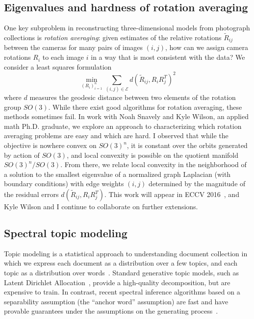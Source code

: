 \documentclass[11pt]{amsart}
\begin{document}
\subsection*{Eigenvalues and hardness of rotation averaging}

One key subproblem in reconstructing three-dimensional models from
photograph collections is {\em rotation averaging}: given estimates of
the relative rotations $\tilde{R}_{ij}$ between the cameras for many
pairs of images $(i,j)$, how can we assign camera rotations $R_i$ to
each image $i$ in a way that is most consistent with the data?  We
consider a least squares formulation
\[
  \min_{(R_i)_{i=1}^n} \sum_{(i,j)
  \in \mathcal{E}} d(\tilde{R}_{ij}, R_i R_j^T)^2
\]
where $d$ measures the geodesic distance between two elements of
the rotation group $SO(3)$.  While there exist good algorithms for
rotation averaging, these methods sometimes fail.  In work with
Noah Snavely and Kyle Wilson, an applied math Ph.D. graduate,
we explore an approach to characterizing which rotation averaging
problems are easy and which are hard.
%
I observed that while the objective is nowhere convex on $SO(3)^n$, it
is constant over the orbits generated by action of $SO(3)$, and local
convexity is possible on the quotient manifold $SO(3)^n/SO(3)$. From
there, we relate local convexity in the neighborhood of a solution to
the smallest eigenvalue of a normalized graph Laplacian (with boundary
conditions) with edge weights $(i,j)$ determined by the magnitude of the
residual errors $d(\tilde{R}_{ij}, R_i R_j^T)$.  This work will appear
in ECCV 2016~\cite{2016-rotations}, and Kyle Wilson and I continue to
collaborate on further extensions.


\subsection*{Spectral topic modeling}

Topic modeling is a statistical approach to understanding
document collection in which we express each document as a distribution
over a few topics, and each topic as a distribution over
words~\cite{Blei:2012:Survey}. Standard
generative topic models, such as
Latent Dirichlet Allocation~\cite{Blei:2003:LDA}, provide a
high-quality decomposition, but are expensive to train. In contrast,
recent spectral inference algorithms based on a separability assumption
(the ``anchor word'' assumption) are fast and have provable guarantees
under the assumptions on the
generating process~\cite{Arora:2012:AGM,Arora:2013:Practical}.
\end{document}

